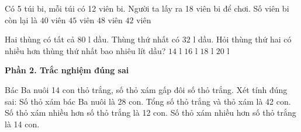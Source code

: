 \begin{ex} %
Có 5 túi bi, mỗi túi có 12 viên bi. Người ta lấy ra 18 viên bi để chơi. Số viên bi còn lại là
\choice
{$40$ viên}
{$45$ viên}
{$48$ viên}
{\True $42$ viên}
\end{ex}

\begin{ex} %
Hai thùng có tất cả $80\text{ l}$ dầu. Thùng thứ nhất có $32\text{ l}$ dầu. Hỏi thùng thứ hai có nhiều hơn thùng thứ nhất bao nhiêu lít dầu?
\choice
{$14\text{ l}$}
{\True $16\text{ l}$}
{$18\text{ l}$}
{$20\text{ l}$}
\end{ex}

\textbf{Phần 2. Trắc nghiệm đúng sai}

\begin{ex} %
Bác Ba nuôi 14 con thỏ trắng, số thỏ xám gấp đôi số thỏ trắng. Xét tính đúng sai:
\choiceTF
{\True Số thỏ xám bác Ba nuôi là 28 con.}
{\True Tổng số thỏ trắng và thỏ xám là 42 con.}
{Số thỏ xám nhiều hơn số thỏ trắng là 12 con.}
{\True Số thỏ xám nhiều hơn số thỏ trắng là 14 con.}
\end{ex}

